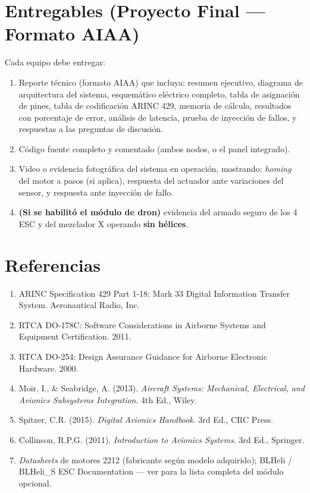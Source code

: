 \documentclass[11pt]{article}
\begin{document}
\section{Entregables (Proyecto Final — Formato AIAA)}
Cada equipo debe entregar:
\begin{enumerate}
  \item Reporte técnico (formato AIAA) que incluya: resumen ejecutivo, diagrama de
        arquitectura del sistema, esquemático eléctrico completo, tabla de asignación
        de pines, tabla de codificación ARINC 429, memoria de cálculo, resultados con
        porcentaje de error, análisis de latencia, prueba de inyección de fallos, y
        respuestas a las preguntas de discusión.
  \item Código fuente completo y comentado (ambos nodos, o el panel integrado).
  \item Video o evidencia fotográfica del sistema en operación, mostrando: \emph{homing}
        del motor a pasos (si aplica), respuesta del actuador ante variaciones del
        sensor, y respuesta ante inyección de fallo.
  \item \textbf{(Si se habilitó el módulo de dron)} evidencia del armado seguro de los 4
        ESC y del mezclador X operando \textbf{sin hélices}.
\end{enumerate}

\section{Referencias}
\begin{enumerate}
  \item ARINC Specification 429 Part 1-18: Mark 33 Digital Information Transfer System.
        Aeronautical Radio, Inc.
  \item RTCA DO-178C: Software Considerations in Airborne Systems and Equipment
        Certification. 2011.
  \item RTCA DO-254: Design Assurance Guidance for Airborne Electronic Hardware. 2000.
  \item Moir, I., \& Seabridge, A. (2013). \emph{Aircraft Systems: Mechanical,
        Electrical, and Avionics Subsystems Integration}. 4th Ed., Wiley.
  \item Spitzer, C.R. (2015). \emph{Digital Avionics Handbook}. 3rd Ed., CRC Press.
  \item Collinson, R.P.G. (2011). \emph{Introduction to Avionics Systems}. 3rd Ed.,
        Springer.
  \item \emph{Datasheets} de motores 2212 (fabricante según modelo adquirido); BLHeli /
        BLHeli\_S ESC Documentation — ver  para la lista
        completa del módulo opcional.
\end{enumerate}
\end{document}
